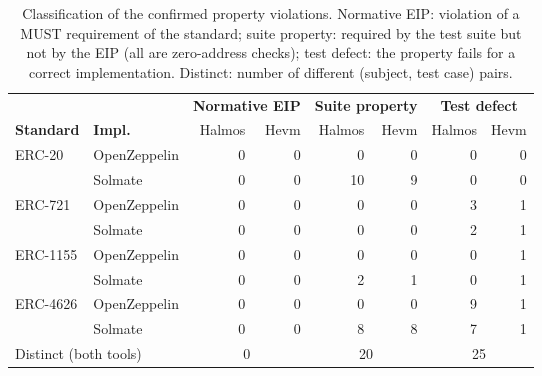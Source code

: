 \begin{table}[htbp]
\centering
\begin{scriptsize}
\begin{tabular}{llrrrrrr}
\toprule
 & & \multicolumn{2}{c}{\textbf{Normative EIP}} & \multicolumn{2}{c}{\textbf{Suite property}} & \multicolumn{2}{c}{\textbf{Test defect}} \\
\cmidrule(lr){3-4}\cmidrule(lr){5-6}\cmidrule(lr){7-8}
\textbf{Standard} & \textbf{Impl.} & Halmos & Hevm & Halmos & Hevm & Halmos & Hevm \\
\midrule
ERC-20 & OpenZeppelin & 0 & 0 & 0 & 0 & 0 & 0 \\
 & Solmate & 0 & 0 & 10 & 9 & 0 & 0 \\
\addlinespace
ERC-721 & OpenZeppelin & 0 & 0 & 0 & 0 & 3 & 1 \\
 & Solmate & 0 & 0 & 0 & 0 & 2 & 1 \\
\addlinespace
ERC-1155 & OpenZeppelin & 0 & 0 & 0 & 0 & 0 & 1 \\
 & Solmate & 0 & 0 & 2 & 1 & 0 & 1 \\
\addlinespace
ERC-4626 & OpenZeppelin & 0 & 0 & 0 & 0 & 9 & 1 \\
 & Solmate & 0 & 0 & 8 & 8 & 7 & 1 \\
\midrule
\multicolumn{2}{l}{Distinct (both tools)} & \multicolumn{2}{c}{0} & \multicolumn{2}{c}{20} & \multicolumn{2}{c}{25} \\
\bottomrule
\end{tabular}
\end{scriptsize}
\caption{Classification of the confirmed property violations. Normative EIP: violation of a MUST requirement of the standard; suite property: required by the test suite but not by the EIP (all are zero-address checks); test defect: the property fails for a correct implementation. Distinct: number of different (subject, test case) pairs.}
\label{tab:classification}
\end{table}
